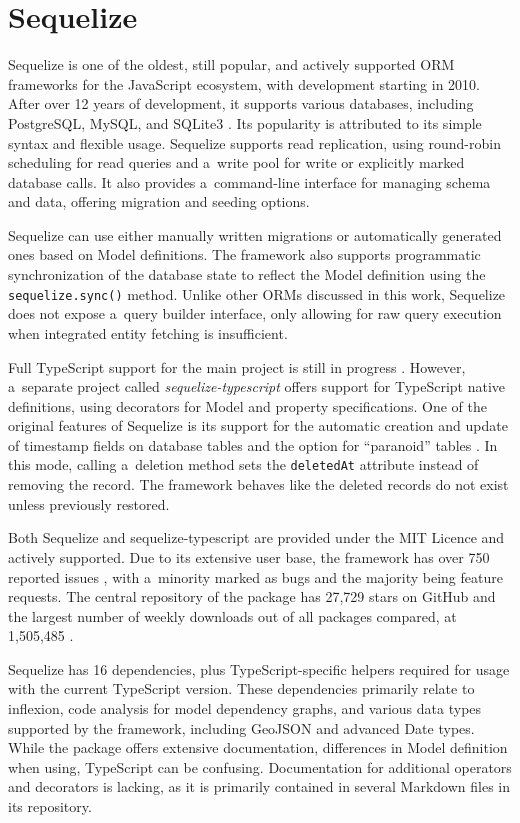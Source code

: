\section{Sequelize}

Sequelize is one of the oldest, still popular, and actively supported ORM
frameworks for the JavaScript ecosystem, with development starting in 2010.
After over 12 years of development, it supports various databases, including
PostgreSQL, MySQL, and SQLite3 \cite{sequelizeDocs}. Its popularity is
attributed to its simple syntax and flexible usage. Sequelize supports read
replication, using round-robin scheduling for read queries and a~write pool for
write or explicitly marked database calls. It also provides a~command-line
interface for managing schema and data, offering migration and seeding options.

Sequelize can use either manually written migrations or automatically generated
ones based on Model definitions. The framework also supports programmatic
synchronization of the database state to reflect the Model definition using the
\texttt{sequelize.sync()} method. Unlike other ORMs discussed in this work,
Sequelize does not expose a~query builder interface, only allowing for raw query
execution when integrated entity fetching is insufficient.

Full TypeScript support for the main project is still in progress
\cite{sequelizeTypescriptSupport}. However, a~separate project called
\textit{sequelize-typescript} \cite{sequelizeTypescriptNpm} offers support for
TypeScript native definitions, using decorators for Model and property
specifications. One of the original features of Sequelize is its support for the
automatic creation and update of timestamp fields on database tables and the
option for \enquote{paranoid} tables \cite{sequelizeParanoid}. In this mode,
calling a~deletion method sets the \texttt{deletedAt} attribute instead of
removing the record. The framework behaves like the deleted records do not exist
unless previously restored.

Both Sequelize and sequelize-typescript are provided under the MIT Licence and
actively supported. Due to its extensive user base, the framework has over 750
reported issues \cite{sequelizeGitHub}, with a~minority marked as bugs and the
majority being feature requests. The central repository of the package has
27,729 stars on GitHub and the largest number of weekly downloads out of all
packages compared, at 1,505,485 \cite{sequelizeNpm}.

Sequelize has 16 dependencies, plus TypeScript-specific helpers required for
usage with the current TypeScript version. These dependencies primarily relate
to inflexion, code analysis for model dependency graphs, and various data types
supported by the framework, including GeoJSON and advanced Date types. While the
package offers extensive documentation, differences in Model definition when
using, TypeScript can be confusing. Documentation for additional operators and
decorators is lacking, as it is primarily contained in several Markdown files in
its repository.

